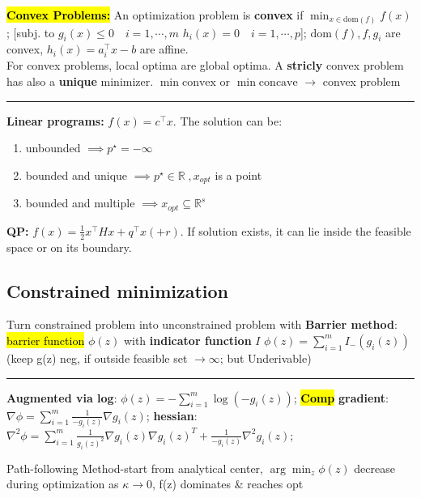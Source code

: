 \documentclass[10pt,a4paper,landscape]{article}
\newcommand{\hlc}[2][yellow]{ {\sethlcolor{#1} \hl{#2}} }
\newcommand{\quadRule}{\vspace{-3pt}\rule{0.23\textwidth}{0.4pt}}
\newcommand{\comp}{\footnotesize{\hlc[cyan]{\textbf{Comp}}}} %
\begin{document}
\begin{multicols*}{4}
\hl{\textbf{Convex Problems:}}
An optimization problem is \textbf{convex} if
$\min_{x\in\mathrm{dom}(f)} f(x)$; 
[subj. to $g_i(x) \leq 0 \quad i=1,\cdots,m$
$h_i(x) = 0 \quad i=1,\cdots,p$];
$\mathrm{dom}(f), f, g_i$ are convex, $h_i(x) = a_i^\top x -b$ are affine.\\
For convex problems, local optima are global optima. A \textbf{stricly} convex problem has also a \textbf{unique} minimizer.
$\min \mathrm{convex}$ or $\min \mathrm{concave}$ $\rightarrow$ convex problem

\quadRule

\textbf{Linear programs:} $f(x) = c^\top x$. The solution can be:
\begin{enumerate}
	\item unbounded $\implies p^\star = -\infty$
	\item bounded and unique $\implies p^\star \in \mathbb{R} \; , x_{opt}$ is a point
	\item bounded and multiple $\implies x_{opt} \subseteq \mathbb{R}^s$
\end{enumerate}

\textbf{QP:} $f(x) = \frac{1}{2}x^\top H x + q^\top x (+r)$. If solution exists, it can lie inside the feasible space or on its boundary.\\


\subsection{Constrained minimization}
Turn constrained problem into unconstrained problem with \textbf{Barrier method}: \hl{barrier function} $\phi(z)$ with \textbf{indicator function} $I$
$\phi(z)=\sum_{i=1}^{m} I_{-}\left(g_{i}(z)\right)$ (keep g(z) neg, if outside feasible set $\rightarrow \infty$; but Underivable)

\quadRule

\textbf{Augmented via log}: $\phi(z)=-\sum_{i=1}^{m} \log \left(-g_{i}(z)\right)$; 
\comp
\textbf{gradient}: $\nabla \phi =\sum_{i=1}^{m} \frac{1}{-g_{i}(z)} \nabla g_{i}(z)$; \textbf{hessian}: $\nabla^{2} \phi =\sum_{i=1}^{m} \frac{1}{g_{i}(z)^{2}} \nabla g_{i}(z) \nabla g_{i}(z)^{T}+\frac{1}{-g_{i}(z)} \nabla^{2} g_{i}(z)$;


Path-following Method-start from analytical center, $\arg\min_z \phi(z)$ decrease during optimization as $\kappa \rightarrow 0 $, f(z) dominates \& reaches opt


\end{multicols*}
\end{document}
